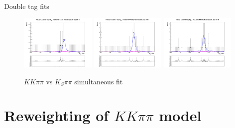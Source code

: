 \documentclass{beamer}
\begin{document}
\begin{frame}{Double tag fits}
\begin{figure}
    \includegraphics[width=0.32\textwidth, clip = true, trim = {0 11cm 0 0}]{Plots/DoubleTagYield_DoubleTag_SCMB_KKpipi_vs_KSpipi_SignalBin0_TagBin6.png}
    \includegraphics[width=0.32\textwidth, clip = true, trim = {0 11cm 0 0}]{Plots/DoubleTagYield_DoubleTag_SCMB_KKpipi_vs_KSpipi_SignalBin0_TagBin7.png}
    \includegraphics[width=0.32\textwidth, clip = true, trim = {0 11cm 0 0}]{Plots/DoubleTagYield_DoubleTag_SCMB_KKpipi_vs_KSpipi_SignalBin0_TagBin8.png}
    \caption{$KK\pi\pi$ vs $K_S\pi\pi$ simultaneous fit}
  \end{figure}
\end{frame}

\section{Reweighting of \texorpdfstring{$KK\pi\pi$}{KKpipi} model}
\end{document}
